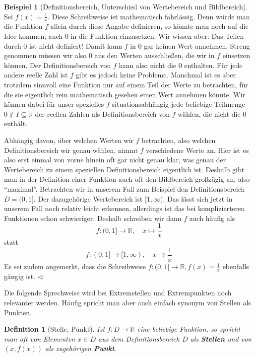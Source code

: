 \documentclass[11pt,reqno, a4paper]{book}
\renewcommand{\textbf}[1]{{\normalfont\bf #1}}
\theoremstyle{mystyle}
\newtheorem{definition}[theorem]{Definition}
\theoremstyle{definition}
\newtheorem{exampleth}[theorem]{Beispiel}
\newenvironment{example}{\begin{exampleth}}{\hspace{\fill}$\triangleleft$\end{exampleth}}
\numberwithin{equation}{chapter}
\begin{document}
\begin{example}[Definitionsbereich, Unterschied von Wertebereich und Bildbereich] \label{bsp:defbereich-wertebereich-bildbereich}
    Sei \(f(x) = \frac{1}{x}\). Diese Schreibweise ist mathematisch fahrlässig. Denn würde man die Funktion \(f\) allein durch diese Angabe definieren, so könnte man noch auf die Idee kommen, auch \(0\) in die Funktion einzusetzen. Wir wissen aber: Das Teilen durch \(0\) ist nicht definiert! Damit kann \(f\) in \(0\) gar keinen Wert annehmen. Streng genommen müssen wir also \(0\) aus den Werten ausschließen, die wir in \(f\) einsetzen können. Der Definitionsbereich von \(f\) kann also nicht die \(0\) enthalten. Für jede andere reelle Zahl ist \(f\) gibt es jedoch keine Probleme. Manchmal ist es aber trotzdem sinnvoll eine Funktion nur auf einem Teil der Werte zu betrachten, für die sie eigentlich rein mathematisch gesehen einen Wert annehmen könnte. Wir können dabei für unser spezielles \(f\) situationsabhängig jede beliebige Teilmenge \(0 \notin I\subseteq \mathbb R\) der reellen Zahlen als Definitionsbereich von \(f\) wählen, die nicht die \(0\) enthält. \par 
    Abhängig davon, über welchen Werten wir \(f\) betrachten, also welchen Definitionsbereich wir genau wählen, nimmt \(f\) verschiedene Werte an. Hier ist es also erst einmal von vorne hinein oft gar nicht genau klar, was genau der Wertebereich zu einem speziellen Definitionsbereich eigentlich ist. Deshalb gibt man in der Definition einer Funktion auch oft den Bildbereich großzügig an, also "`maximal"'. Betrachten wir in unserem Fall zum Beispiel den Definitionsbereich \(D = (0,1]\). Der dazugehörige Wertebereich ist \([1, \infty)\). Das lässt sich jetzt in unserem Fall noch relativ leicht erkennen, allerdings ist das bei komplizierteren Funktionen schon schwieriger. Deshalb schreiben wir dann \(f\) auch häufig als 
    \begin{equation*}
        f: (0,1] \to \mathbb R, \quad x \mapsto \frac{1}{x}
    \end{equation*}
    statt
    \begin{equation*}
        f: (0,1] \to [1, \infty), \quad x \mapsto \frac{1}{x}
    \end{equation*}
    Es sei zudem angemerkt, dass die Schreibweise \(f:(0,1]\to \mathbb R, f(x) = \frac{1}{x}\) ebenfalls gängig ist. 
\end{example}

Die folgende Sprechweise wird bei Extremstellen und Extrempunkten noch relevanter werden. Häufig spricht man aber auch einfach synonym von Stellen als Punkten. 
\begin{definition}[Stelle, Punkt]
    Ist \(f:D\to\mathbb R\) eine beliebige Funktion, so spricht man oft von Elementen \(x \in D\) aus dem Definitionsbereich \(D\) als \textbf{Stellen} und von \((x,f(x))\) als zugehörigen \textbf{Punkt}.
\end{definition}
\end{document}
